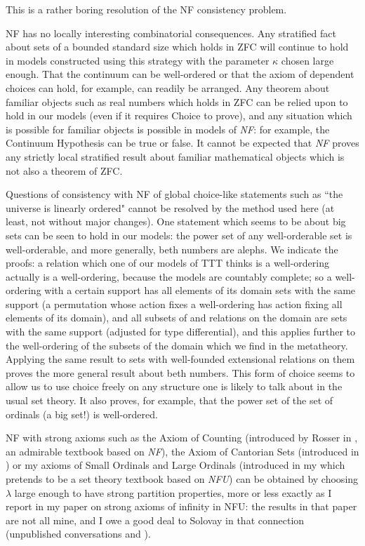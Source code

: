 \documentclass[112pt]{article}
\begin{document}
This is a rather boring resolution of the NF consistency problem.

NF has no locally interesting combinatorial consequences.   Any stratified fact about sets of a bounded standard size which holds in ZFC will continue to hold in models constructed using this strategy with the parameter $\kappa$ chosen large enough.
That the continuum can be well-ordered or that the axiom of dependent choices can hold, for example, can readily be arranged.  Any theorem about familiar objects such as real numbers which holds in ZFC can be relied upon to hold in our models
(even if it requires Choice to prove), and any situation which is possible for familiar objects is possible in models of {\em NF\/}:  for example, the Continuum Hypothesis can be true or false.  It cannot be expected that {\em NF\/} proves any strictly local stratified result about familiar mathematical objects which is not also a theorem of ZFC.

Questions of consistency with NF of global choice-like statements such as ``the universe is linearly ordered"  cannot be resolved by the method used here (at least, not without major changes).  One statement which seems to be about big sets can be seen to hold in our models:  the power set of any well-orderable set is well-orderable, and more generally, beth numbers are alephs.  We indicate the proofs:  a relation which one of our models of TTT thinks is a well-ordering actually is a well-ordering, because the models are countably complete;  so a well-ordering with a certain support has all elements of its domain sets with the same support (a permutation whose action fixes a well-ordering has action fixing all elements of its domain), and all subsets of and relations on the domain are sets with the same support (adjusted for type differential), and this applies further to the well-ordering of the subsets of the domain which we find in the metatheory.  Applying the same result to sets with well-founded extensional relations on them proves the more general result about beth numbers.  This form of choice seems to allow us to use choice freely on any structure one is likely to talk about in the usual set theory.  It also proves, for example, that the power set of the set of ordinals (a big set!) is well-ordered.

NF with strong axioms such as the Axiom of Counting (introduced by Rosser in \cite{rosser}, an admirable textbook based on {\em NF\/}), the Axiom of Cantorian Sets (introduced in \cite{henson})  or my axioms of Small Ordinals and Large Ordinals (introduced in  my \cite{mybook} which pretends to be a set theory textbook based on {\em NFU\/}) can be obtained by choosing $\lambda$ large enough to have strong partition properties, more or less exactly as I report in my paper \cite{strongaxioms} on strong axioms of infinity in NFU:  the results in that paper are not all mine, and I owe a good deal to Solovay in that connection (unpublished conversations and \cite{nfub}).
\end{document}
